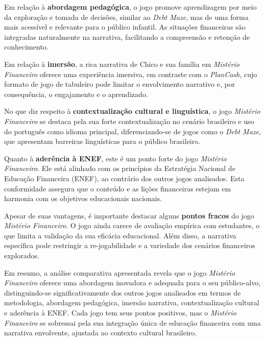 Em relação à \textbf{abordagem pedagógica}, o jogo promove aprendizagem por meio da exploração e tomada de decisões, similar ao \textit{Debt Maze}, mas de uma forma mais acessível e relevante para o público infantil. As situações financeiras são integradas naturalmente na narrativa, facilitando a compreensão e retenção de conhecimento.

Em relação à \textbf{imersão}, a rica narrativa de Chico e sua família em \textit{Mistério Financeiro} oferece uma experiência imersiva, em contraste com o \textit{PlanCash}, cujo formato de jogo de tabuleiro pode limitar o envolvimento narrativo e, por consequência, o engajamento e o aprendizado.

No que diz respeito à \textbf{contextualização cultural e linguística}, o jogo \textit{Mistério Financeiro} se destaca pela sua forte contextualização no cenário brasileiro e uso do português como idioma principal, diferenciando-se de jogos como o \textit{Debt Maze}, que apresentam barreiras linguísticas para o público brasileiro.

Quanto à \textbf{aderência à ENEF}, este é um ponto forte do jogo \textit{Mistério Financeiro}. Ele está alinhado com os princípios da Estratégia Nacional de Educação Financeira (ENEF), ao contrário dos outros jogos analisados. Esta conformidade assegura que o conteúdo e as lições financeiras estejam em harmonia com os objetivos educacionais nacionais.

Apesar de suas vantagens, é importante destacar alguns \textbf{pontos fracos} do jogo \textit{Mistério Financeiro}. O jogo ainda carece de avaliação empírica com estudantes, o que limita a validação da sua eficácia educacional. Além disso, a narrativa específica pode restringir a re-jogabilidade e a variedade dos cenários financeiros explorados.

Em resumo, a análise comparativa apresentada revela que o jogo \textit{Mistério Financeiro} oferece uma abordagem inovadora e adequada para o seu público-alvo, distinguindo-se significativamente dos outros jogos analisados em termos de metodologia, abordagem pedagógica, imersão narrativa, contextualização cultural e aderência à ENEF. Cada jogo tem seus pontos positivos, mas o \textit{Mistério Financeiro} se sobressai pela sua integração única de educação financeira com uma narrativa envolvente, ajustada ao contexto cultural brasileiro.